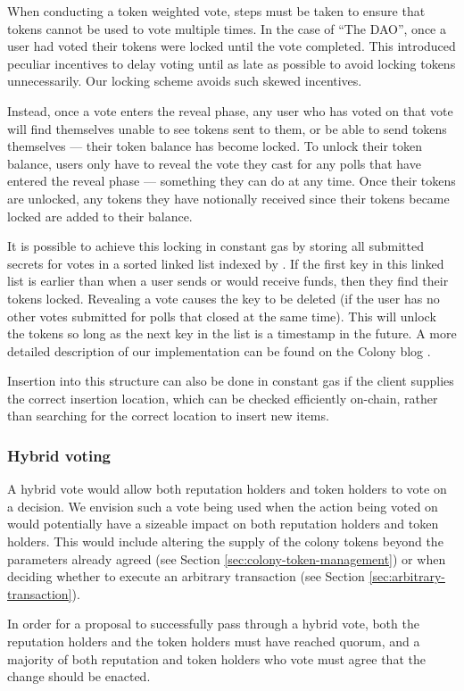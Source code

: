 When conducting a token weighted vote, steps must be taken to ensure that tokens cannot be used to vote multiple times. In the case of ``The DAO'', once a user had voted their tokens were locked until the vote completed. This introduced peculiar incentives to delay voting until as late as possible to avoid locking tokens unnecessarily.  Our locking scheme avoids such skewed incentives.

Instead, once a vote enters the reveal phase, any user who has voted on that vote will find themselves unable to see tokens sent to them, or be able to send tokens themselves --- their token balance has become locked. To unlock their token balance, users only have to reveal the vote they cast for any polls that have entered the reveal phase --- something they can do at any time. Once their tokens are unlocked, any tokens they have notionally received since their tokens became locked are added to their balance.

It is possible to achieve this locking in constant gas by storing all submitted secrets for votes in a sorted linked list indexed by . If the first key in this linked list is earlier than  when a user sends or would receive funds, then they find their tokens locked. Revealing a vote causes the key to be deleted (if the user has no other votes submitted for polls that closed at the same time). This will unlock the tokens so long as the next key in the list is a timestamp in the future. A more detailed description of our implementation can be found on the Colony blog \cite{ColonyVoting}.

Insertion into this structure can also be done in constant gas if the client supplies the correct insertion location, which can be checked efficiently on-chain, rather than searching for the correct location to insert new items.

\subsubsection{Hybrid voting}
A hybrid vote would allow both reputation holders and token holders to vote on a decision. We envision such a vote being used when the action being voted on would potentially have a sizeable impact on both reputation holders and token holders. This would include altering the supply of the colony tokens beyond the parameters already agreed (see Section \ref{sec:colony-token-management}) or when deciding whether to execute an arbitrary transaction (see Section \ref{sec:arbitrary-transaction}).

In order for a proposal to successfully pass through a hybrid vote, both the reputation holders and the token holders must have reached quorum, and a majority of both reputation and token holders who vote must agree that the change should be enacted.